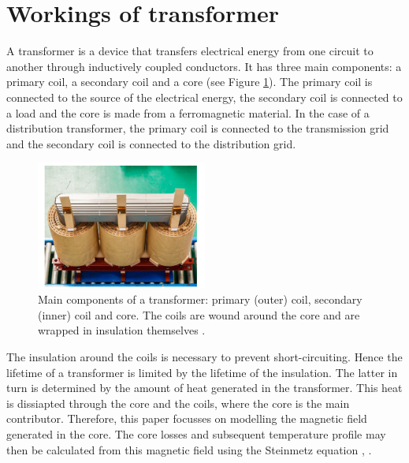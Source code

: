 \section{Workings of transformer}
A transformer is a device that transfers electrical energy from one circuit to another through inductively coupled conductors. 
It has three main components: a primary coil, a secondary coil and a core (see Figure \ref{fig:transformercore}). 
The primary coil is connected to the source of the electrical energy, the secondary coil is connected to a load and the core is made from a ferromagnetic material.
In the case of a distribution transformer, the primary coil is connected to the transmission grid and the secondary coil is connected to the distribution grid.
\begin{figure}[H]
    \centering
    \includegraphics[width=0.5\textwidth]{img/transformercore.png}
    \caption{Main components of a transformer: primary (outer) coil, secondary (inner) coil and core. The coils are wound around the core
    and are wrapped in insulation themselves \cite{sSatsangi}.}
    \label{fig:transformercore}
\end{figure}

The insulation around the coils is necessary to prevent short-circuiting. Hence the lifetime of a transformer is limited by the lifetime of the insulation.
The latter in turn is determined by the amount of heat generated in the transformer. This heat is dissiapted through the core and the coils, where the core is the main contributor.
Therefore, this paper focusses on modelling the magnetic field generated in the core. 
The core losses and subsequent temperature profile may then be calculated from this magnetic field using the Steinmetz equation \cite{steinmetzEq},
\cite{vanDijk2022}.

